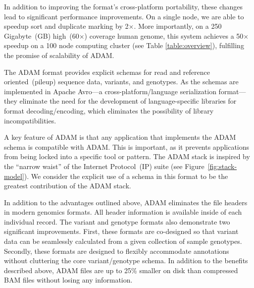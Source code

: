 \documentclass[10pt,twocolumn]{article}
\theoremstyle{plain}
\begin{document}
In addition to improving the format's cross-platform portability, these changes lead to significant performance improvements. On a single
node, we are able to speedup sort and duplicate marking by 2$\times$. More importantly, on a 250 Gigabyte~(GB) high~(60$\times$) coverage
human genome, this system achieves a 50$\times$ speedup on a 100 node computing cluster (see Table \ref{table:overview}), fulfilling the promise of scalability of ADAM.


The ADAM format provides explicit schemas for read and reference oriented~(pileup) sequence data, variants, and genotypes. As the schemas are implemented in Apache Avro---a cross-platform/language serialization format---they eliminate
the need for the development of language-specific libraries for format decoding/encoding, which eliminates the possibility of library
incompatibilities.

A key feature of ADAM is that any application that implements the ADAM schema is compatible with ADAM. This is important, as it prevents
applications from being locked into a specific tool or pattern. %
The ADAM stack is
inspired by the ``narrow waist'' of the Internet Protocol~(IP) suite (see Figure~\ref{fig:stack-model}). We consider the explicit use of a schema in this format to be the greatest contribution of the ADAM stack.


In addition to the advantages outlined above, ADAM eliminates the file headers in modern genomics formats. All header information is available
inside of each individual record. The variant and genotype formats also demonstrate two significant improvements. First, these formats are
co-designed so that variant data can be seamlessly calculated from a given collection of sample genotypes. Secondly, these formats are designed
to flexibly accommodate annotations without cluttering the core variant/genotype schema. In addition to the benefits described above, ADAM
files are up to 25\% smaller on disk than compressed BAM files without losing any information.
\end{document}
